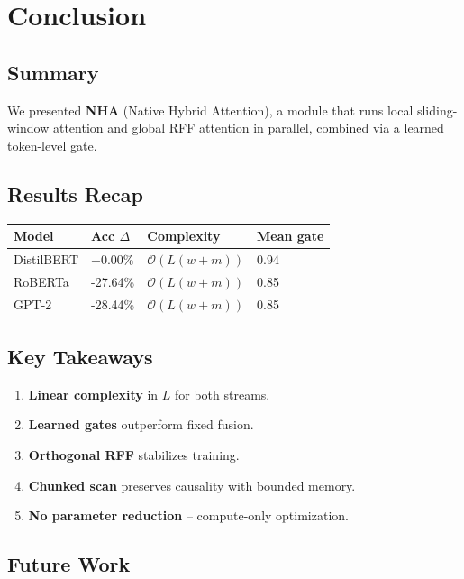 
\section{Conclusion}

\subsection{Summary}

We presented \textbf{NHA} (Native Hybrid Attention), a module that runs local 
sliding-window attention and global RFF attention in parallel, combined via 
a learned token-level gate.

\subsection{Results Recap}

\begin{table}[H]
\centering
\small
\begin{tabular}{llll}
\toprule
\textbf{Model} & \textbf{Acc $\Delta$} & \textbf{Complexity} & \textbf{Mean gate} \\
\midrule
DistilBERT & +0.00\% & $\mathcal{O}(L(w+m))$ & 0.94 \\
RoBERTa & -27.64\% & $\mathcal{O}(L(w+m))$ & 0.85 \\
GPT-2 & -28.44\% & $\mathcal{O}(L(w+m))$ & 0.85 \\
\bottomrule
\end{tabular}
\end{table}

\subsection{Key Takeaways}

\begin{enumerate}
\item \textbf{Linear complexity} in $L$ for both streams.
\item \textbf{Learned gates} outperform fixed fusion.
\item \textbf{Orthogonal RFF} stabilizes training.
\item \textbf{Chunked scan} preserves causality with bounded memory.
\item \textbf{No parameter reduction} -- compute-only optimization.

\end{enumerate}
\subsection{Future Work}

